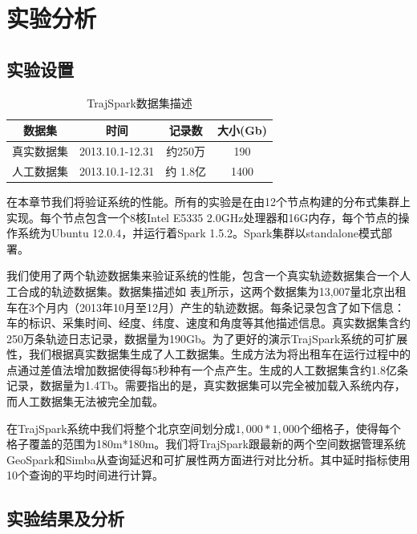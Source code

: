 \section{实验分析}\label{sec-c3-exp}

\subsection{实验设置}
\begin{table}[t]
	\centering  
	\renewcommand\arraystretch{1.2}
	\begin{tabular}{|c|c|c|c|} 
		\hline
		数据集 & 时间 & 记录数 & 大小(Gb)  \\ \hline
		真实数据集 & 2013.10.1-12.31 & 约250万 & 190  \\ \hline
		人工数据集 & 2013.10.1-12.31& 约 1.8亿 & 1400\\ \hline
	\end{tabular}
	\caption{TrajSpark数据集描述}
	\label{table:SystemData}
\end{table}
在本章节我们将验证系统的性能。所有的实验是在由12个节点构建的分布式集群上实现。每个节点包含一个8核Intel E5335 2.0GHz处理器和16G内存，每个节点的操作系统为Ubuntu 12.0.4，并运行着Spark 1.5.2。Spark集群以standalone模式部署。



我们使用了两个轨迹数据集来验证系统的性能\cite{TrajSpark}，包含一个真实轨迹数据集合一个人工合成的轨迹数据集。数据集描述如
表\ref{table:SystemData}所示，这两个数据集为13,007量北京出租车在3个月内（2013年10月至12月）产生的轨迹数据。每条记录包含了如下信息：车的标识、采集时间、经度、纬度、速度和角度等其他描述信息。真实数据集含约250万条轨迹日志记录，数据量为190Gb。为了更好的演示TrajSpark系统的可扩展性，我们根据真实数据集生成了人工数据集。生成方法为将出租车在运行过程中的点通过差值法增加数据使得每5秒种有一个点产生。生成的人工数据集含约1.8亿条记录，数据量为1.4Tb。需要指出的是，真实数据集可以完全被加载入系统内存，而人工数据集无法被完全加载。

在TrajSpark系统中我们将整个北京空间划分成$1,000*1,000$个细格子，使得每个格子覆盖的范围为180m*180m。我们将TrajSpark跟最新的两个空间数据管理系统GeoSpark和Simba从查询延迟和可扩展性两方面进行对比分析。其中延时指标使用10个查询的平均时间进行计算。


\subsection{实验结果及分析}

